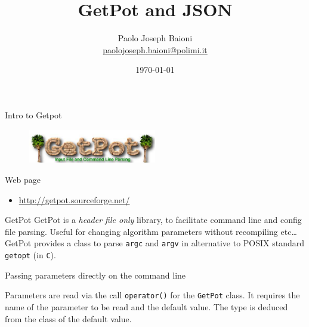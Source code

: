 \documentclass[10pt,aspectratio=169]{beamer}
\begin{document}
    \title{GetPot and JSON}
\author{Paolo Joseph Baioni\\ \href{mailto:paolojoseph.baioni@polimi.it}{\color{blue}paolojoseph.baioni@polimi.it}}
\date{\today}
\begin{frame}
    \maketitle
\end{frame}

\begin{frame}{Intro to Getpot}
    \begin{figure}
        \centering
        \includegraphics[width=0.5\textwidth]{images/GetPot_logo.jpg}
    \end{figure}

    \begin{block}{Web page}
        \centering
        \begin{itemize}
            \item \url{http://getpot.sourceforge.net/}
        \end{itemize}
    \end{block}
\end{frame}

\begin{frame}{GetPot}
    GetPot is a \emph{header file only} library,
    to facilitate command line and config file parsing.
    Useful for changing algorithm parameters without recompiling
     etc\ldots\\[1cm]

    GetPot provides a class to parse \texttt{argc} and \texttt{argv}
    in alternative to POSIX standard \texttt{getopt} (in \texttt{C}).
\end{frame}

\begin{frame}[fragile]{Passing parameters directly on the command line}

    

    Parameters are read via the call \texttt{operator()} for the \texttt{GetPot} class.
    It requires the name of the parameter to be read and the default value.
    The type is deduced from the class of the default value.
\end{frame}
\end{document}
